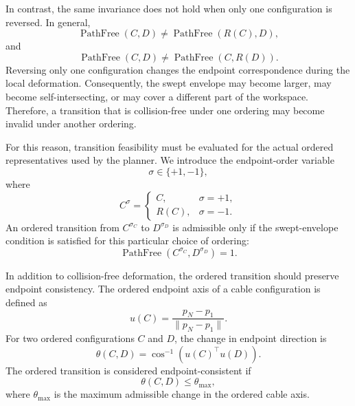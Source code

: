 \documentclass{pas}
\begin{document}
In contrast, the same invariance does not hold when only one configuration is
reversed. In general,
\begin{equation}
\operatorname{PathFree}(C,D)
\neq
\operatorname{PathFree}(R(C),D),
\end{equation}
and
\begin{equation}
\operatorname{PathFree}(C,D)
\neq
\operatorname{PathFree}(C,R(D)).
\end{equation}
Reversing only one configuration changes the endpoint correspondence during
the local deformation. Consequently, the swept envelope may become larger,
may become self-intersecting, or may cover a different part of the workspace.
Therefore, a transition that is collision-free under one ordering may become
invalid under another ordering.

For this reason, transition feasibility must be evaluated for the actual ordered
representatives used by the planner. We introduce the endpoint-order variable
\begin{equation}
\sigma \in \{+1,-1\},
\end{equation}
where
\begin{equation}
C^{\sigma}=
\begin{cases}
C, & \sigma=+1,\\
R(C), & \sigma=-1.
\end{cases}
\end{equation}
An ordered transition from $C^{\sigma_C}$ to $D^{\sigma_D}$ is admissible only
if the swept-envelope condition is satisfied for this particular choice of
ordering:
\begin{equation}
\operatorname{PathFree}
\left(
C^{\sigma_C},D^{\sigma_D}
\right)=1.
\end{equation}

In addition to collision-free deformation, the ordered transition should preserve
endpoint consistency. The ordered endpoint axis of a cable configuration is
defined as
\begin{equation}
u(C)=
\frac{p_N-p_1}{\|p_N-p_1\|}.
\end{equation}
For two ordered configurations $C$ and $D$, the change in endpoint direction is
\begin{equation}
\theta(C,D)
=
\cos^{-1}
\left(
u(C)^{\top}u(D)
\right).
\end{equation}
The ordered transition is considered endpoint-consistent if
\begin{equation}
\theta(C,D)\leq \theta_{\max},
\end{equation}
where $\theta_{\max}$ is the maximum admissible change in the ordered cable
axis.
\end{document}
